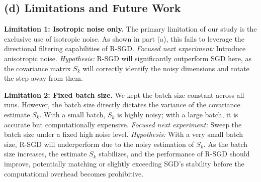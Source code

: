 \subsection*{(d) Limitations and Future Work}

\textbf{Limitation 1: Isotropic noise only.} The primary limitation of our study is the exclusive use of isotropic noise. As shown in part (a), this fails to leverage the directional filtering capabilities of R-SGD. 
\textit{Focused next experiment:} Introduce anisotropic noise. \textit{Hypothesis:} R-SGD will significantly outperform SGD here, as the covariance matrix \(S_k\) will correctly identify the noisy dimensions and rotate the step away from them.

\textbf{Limitation 2: Fixed batch size.} We kept the batch size constant across all runs. However, the batch size directly dictates the variance of the covariance estimate \(S_k\). With a small batch, \(S_k\) is highly noisy; with a large batch, it is accurate but computationally expensive.
\textit{Focused next experiment:} Sweep the batch size under a fixed high noise level. 
\textit{Hypothesis:} With a very small batch size, R-SGD will underperform due to the noisy 
estimation of \(S_k\). As the batch size increases, the estimate \(S_k\) stabilizes, and the 
performance of R-SGD should improve, potentially matching or slightly exceeding SGD's stability 
before the computational overhead becomes prohibitive.